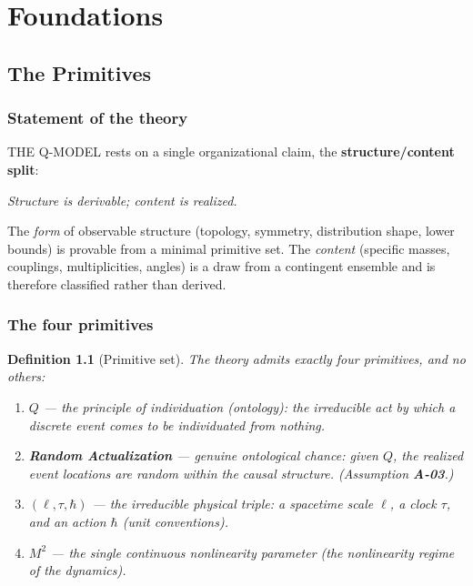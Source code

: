 \documentclass[11pt,twoside]{book}
\newtheorem{definition}[theorem]{Definition}
\begin{document}
\tableofcontents

\mainmatter

\part{Foundations}

\chapter{The Primitives}
\label{ch:primitives}

\section{Statement of the theory}

THE Q-MODEL rests on a single organizational claim, the \textbf{structure/content split}:

\begin{center}
\emph{Structure is derivable; content is realized.}
\end{center}

The \emph{form} of observable structure (topology, symmetry, distribution shape, lower
bounds) is provable from a minimal primitive set. The \emph{content} (specific masses,
couplings, multiplicities, angles) is a draw from a contingent ensemble and is therefore
classified rather than derived.

\section{The four primitives}

\begin{definition}[Primitive set]
The theory admits exactly four primitives, and no others:
\begin{enumerate}
\item \textbf{$Q$} — the principle of individuation (ontology): the irreducible act by
which a discrete event comes to be individuated from nothing.
\item \textbf{Random Actualization} — genuine ontological chance: given $Q$, the realized
event locations are random within the causal structure. (Assumption \textbf{A-03}.)
\item \textbf{$(\ell,\tau,\hbar)$} — the irreducible physical triple: a spacetime scale
$\ell$, a clock $\tau$, and an action $\hbar$ (unit conventions).
\item \textbf{$M^2$} — the single continuous nonlinearity parameter (the nonlinearity
regime of the dynamics).
\end{enumerate}
\end{definition}
\end{document}
